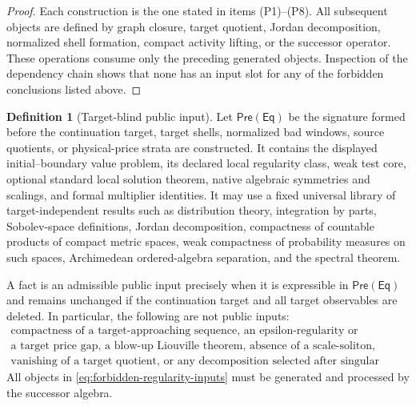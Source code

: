 \documentclass[11pt]{article}
\numberwithin{section}{part}
\theoremstyle{plain}
\theoremstyle{definition}
\newtheorem{definition}[definition]{Definition}
\theoremstyle{remark}
\begin{document}
\begin{proof}
Each construction is the one stated in items \textup{(P1)}--\textup{(P8)}.
All subsequent objects are defined by graph closure, target quotient, Jordan
decomposition, normalized shell formation, compact activity lifting, or the
successor operator.  These operations consume only the preceding generated
objects.  Inspection of the dependency chain shows that none has an input
slot for any of the forbidden conclusions listed above.
\end{proof}

\begin{definition}[Target-blind public input]
\label{def:target-blind-public-input}
Let \(\mathsf{Pre}(\mathsf{Eq})\) be the signature formed before the
continuation target, target shells, normalized bad windows, source quotients,
or physical-price strata are constructed.  It contains the displayed
initial--boundary value problem, its declared local regularity class, weak
test core, optional standard local solution theorem, native algebraic
symmetries and scalings, and formal multiplier identities.  It may use a fixed universal
library of target-independent results such as distribution theory, integration
by parts, Sobolev-space definitions, Jordan decomposition, compactness of
countable products of compact metric spaces, weak compactness of probability
measures on such spaces, Archimedean ordered-algebra separation, and the
spectral theorem.

A fact is an admissible public input precisely when it is expressible in
\(\mathsf{Pre}(\mathsf{Eq})\) and remains unchanged if the continuation target
and all target observables are deleted.  In particular, the following are not
public inputs:
\begin{equation}
 \label{eq:forbidden-regularity-inputs}
 \begin{gathered}
 \text{compactness of a target-approaching sequence, an epsilon-regularity or
 continuation conclusion,}\\
 \text{a target price gap, a blow-up Liouville theorem, absence of a
 scale-soliton,}\\
 \text{vanishing of a target quotient, or any decomposition selected after
 singular shells are formed.}
 \end{gathered}
\end{equation}
All objects in \eqref{eq:forbidden-regularity-inputs} must be generated and
processed by the successor algebra.
\end{definition}
\end{document}
